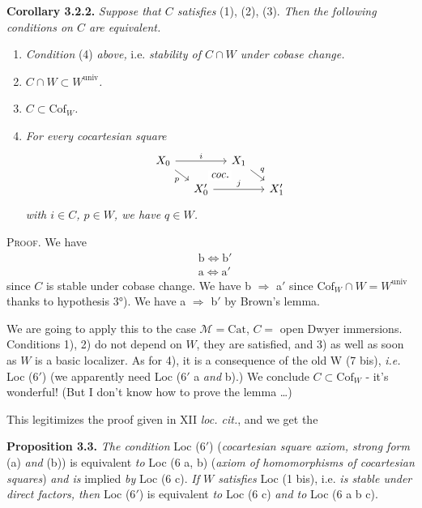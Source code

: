 \documentclass[11pt]{article}
\newcommand{\msp}[1]{\marginpar{\footnotesize [#1]}}
\newcommand{\Cof}{\mathrm{Cof}}
\newcommand{\univ}{\mathrm{univ}}
\begin{document}
\textbf{Corollary 3.2.2.} \textit{Suppose that $C$ satisfies} (1), (2), (3). \textit{Then}
\msp{page 21}\textit{the following conditions on $C$ are equivalent.}
\begin{enumerate}
\item[a)] \textit{Condition} (4) \textit{above,} i.e. \textit{stability of $C \cap W$ under cobase change.}
\item[a$'$)] \textit{$C \cap W \subset W^{\univ}$.}
\item[b)] \textit{$C \subset \Cof_W$.}
\item[b$'$)] \textit{For every cocartesian square}
\[
\begin{tikzcd}[ampersand replacement=\&, row sep=small, column sep=small]
X_0 \arrow[rr, "i"] \arrow[dr, "p"'] \arrow[to=2-4, phantom, "\textit{coc.}" description] \& \& X_1 \arrow[dr, "q"] \& \\
\& X'_0 \arrow[rr, "j"] \& \& X'_1
\end{tikzcd}
\]
\textit{with $i \in C$, $p \in W$, we have $q \in W$.}
\end{enumerate}
\textsc{Proof}. We have
\[
\begin{aligned}
&\text{b} \iff \text{b}'\\
&\text{a} \iff \text{a}'
\end{aligned}
\]
since $C$ is stable under cobase change. We have b $\Longrightarrow$ a$'$ since $\Cof_W \cap W = W^{\univ}$ thanks to hypothesis 3°). We have a $\Longrightarrow$ b$'$ by Brown's lemma.

We are going to apply this to the case $\mathcal{M} = \mathrm{Cat}$, $C =$ open Dwyer immersions. Conditions 1), 2) do not depend on $W$, they are satisfied, and 3) as well as soon as $W$ is a basic localizer. As for 4), it is a consequence of the old W (7 bis), \textit{i.e.} Loc (6$'$) (we
\msp{page 22}apparently need Loc (6$'$ a \textit{and} b).) We conclude $C \subset \Cof_W$ - it's wonderful! (But I don't know how to prove the lemma \dots)

This legitimizes the proof given in XII \textit{loc. cit.}, and we get the

\textbf{Proposition 3.3.} \textit{The condition} Loc (6$'$) (\textit{cocartesian square axiom, strong form} (a) \textit{and} (b)) is equivalent \textit{to} Loc (6 a, b) (\textit{axiom of homomorphisms of cocartesian squares}) \textit{and is} implied \textit{by} Loc (6 c). \textit{If $W$ satisfies} Loc (1 bis), i.e. \textit{is stable under direct factors, then} Loc (6$'$) is equivalent \textit{to} Loc (6 c) \textit{and to} Loc (6 a b c).
\end{document}
